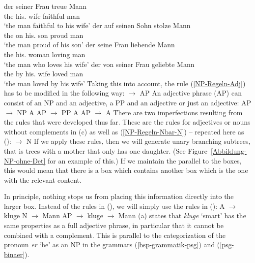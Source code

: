 \eal
\ex 
\gll der seiner Frau treue Mann\\
     the his.\DAT{} wife faithful man\\
\glt `the man faithful to his wife'
\ex 
\gll der auf seinen Sohn stolze Mann\\
     the on his.\ACC{} son proud man\\
\glt `the man proud of his son'
\ex 
\gll der seine Frau liebende Mann\\
     the his.\ACC{} woman loving man\\
\glt `the man who loves his wife'
\ex 
\gll der von seiner Frau geliebte Mann\\
     the by his.\DAT{} wife loved man\\
\glt `the man loved by his wife'	 
\zl
Taking this into account, the rule (\ref{NP-Regeln-Adj}) has to be modified in the following way:
\ea
\label{NP-Regeln-AP} 
\nbar $\to$ AP \nbar
\z
An adjective phrase (AP) can consist of an NP and an adjective, a PP and an adjective or just an adjective:
\eal
\ex AP $\to$ NP A
\ex AP $\to$ PP A
\ex AP $\to$ A
\zl
There are two imperfections resulting from the rules that were developed thus far. These are the rules for adjectives
or nouns without complements in (c) as well as (\ref{NP-Regeln-Nbar-N}) -- repeated here as ():
\ea
\nbar $\to$ N
\z
If we apply these rules, then we will generate unary branching subtrees, that is trees with a mother that
only has one daughter. (See Figure~\ref{Abbildung-NP-ohne-Det} for an example of this.) If we maintain the
parallel to the boxes, this would mean that there is a box which contains another box which is the one with 
the relevant content.

In principle, nothing stops us from placing this information directly into the larger box. Instead of
the rules in (), we will simply use the rules in ():
\eal
\ex A $\to$ kluge
\ex N $\to$ Mann
\zl
\eal
\label{Lexikon-Projektion}
\ex AP $\to$ kluge
\ex \nbar $\to$ Mann
\zl
(a) states that \emph{kluge}  `smart' has the same properties as a full adjective phrase, in particular that it cannot be combined
with a complement. This is parallel to the categorization of the pronoun \emph{er} `he' as an NP in the grammars
(\ref{bsp-grammatik-psg}) and (\ref{psg-binaer}).

